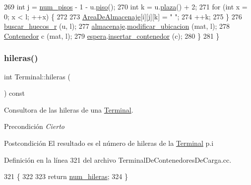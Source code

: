 \begin{DoxyCode}
269         \textcolor{keywordtype}{int} j = \hyperlink{class_terminal_ad6cdee7fe26b4443d45b0a18c345a86d}{num\_pisos} - 1 - u.\hyperlink{class_ubicacion_af6099f8de4dee993e4c9119e1f879070}{piso}();
270         \textcolor{keywordtype}{int} k = u.\hyperlink{class_ubicacion_abed323ffb2eace375e80bc395fdaeb39}{plaza}() + 2;
271         \textcolor{keywordflow}{for} (\textcolor{keywordtype}{int} x = 0; x < l; ++x) \{
272     
273             \hyperlink{class_terminal_a50670862a5cdeb0504efd1c45b6416dc}{AreaDeAlmacenaje}[i][j][k] = \textcolor{stringliteral}{" "};
274             ++k;
275         \}
276         \hyperlink{class_terminal_a56204987306ed811046d3ade11fff2cb}{buscar\_huecos\_r} (u, l);
277         \hyperlink{class_terminal_a1d87d7b16c4f460eee6f1ab73da90fd2}{almacenaje}.\hyperlink{class_almacenaje_a4e225d0899f7c49b3c513ed61f63b4ef}{modificar\_ubicacion} (mat, l);
278         \hyperlink{class_contenedor}{Contenedor} c (mat, l);
279         \hyperlink{class_terminal_ac9f71207d73c8d05a9d9d6c046f9f8c3}{espera}.\hyperlink{class_espera_a7154136eb8addbeebe5cc1406d6400c0}{insertar\_contenedor} (c);
280     \}
281 \}
\end{DoxyCode}
\mbox{\label{class_terminal_a6e7268ad5b0ffbf1484f1f1522e800f0}} 
\subsubsection{\texorpdfstring{hileras()}{hileras()}}
{\footnotesize\ttfamily int Terminal\+::hileras (\begin{DoxyParamCaption}{ }\end{DoxyParamCaption}) const}



Consultora de las hileras de una \hyperlink{class_terminal}{Terminal}. 

\begin{DoxyPrecond}{Precondición}
{\itshape Cierto} 
\end{DoxyPrecond}
\begin{DoxyPostcond}{Postcondición}
El resultado es el número de hileras de la \hyperlink{class_terminal}{Terminal} p.\+i 
\end{DoxyPostcond}


Definición en la línea 321 del archivo Terminal\+De\+Contenedores\+De\+Carga.\+cc.


\begin{DoxyCode}
321                             \{
322     
323     \textcolor{keywordflow}{return} \hyperlink{class_terminal_a865c963b18aa837549dd637d439e8502}{num\_hileras};
324 \}
\end{DoxyCode}
\mbox{\label{class_terminal_a06602e79ec9e7bca40d73d7a6c436fe3}} 
